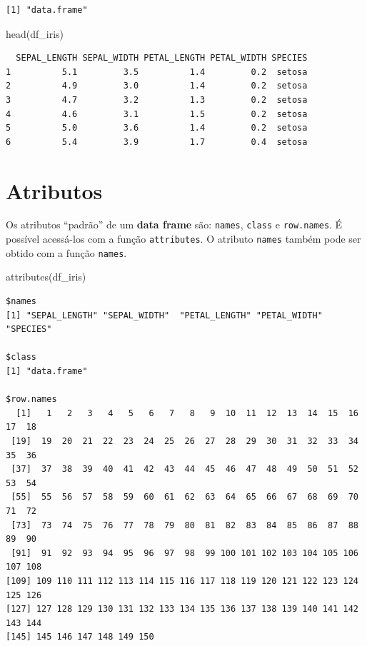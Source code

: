 \documentclass[
  letterpaper,
  DIV=11,
  numbers=noendperiod]{scrreprt}
\newenvironment{Shaded}{\begin{snugshade}}{\end{snugshade}}
\newcommand{\FunctionTok}[1]{\textcolor[rgb]{0.28,0.35,0.67}{#1}}
\newcommand{\NormalTok}[1]{\textcolor[rgb]{0.00,0.23,0.31}{#1}}
\begin{document}
\begin{verbatim}
[1] "data.frame"
\end{verbatim}

\begin{Shaded}
\begin{Highlighting}[]
\FunctionTok{head}\NormalTok{(df\_iris)}
\end{Highlighting}
\end{Shaded}

\begin{verbatim}
  SEPAL_LENGTH SEPAL_WIDTH PETAL_LENGTH PETAL_WIDTH SPECIES
1          5.1         3.5          1.4         0.2  setosa
2          4.9         3.0          1.4         0.2  setosa
3          4.7         3.2          1.3         0.2  setosa
4          4.6         3.1          1.5         0.2  setosa
5          5.0         3.6          1.4         0.2  setosa
6          5.4         3.9          1.7         0.4  setosa
\end{verbatim}

\hypertarget{atributos}{%
\section{Atributos}\label{atributos}}

Os atributos ``padrão'' de um \textbf{data frame} são: \texttt{names},
\texttt{class} e \texttt{row.names}. É possível acessá-los com a função
\texttt{attributes}. O atributo \texttt{names} também pode ser obtido
com a função \texttt{names}.

\begin{Shaded}
\begin{Highlighting}[]
\FunctionTok{attributes}\NormalTok{(df\_iris)}
\end{Highlighting}
\end{Shaded}

\begin{verbatim}
$names
[1] "SEPAL_LENGTH" "SEPAL_WIDTH"  "PETAL_LENGTH" "PETAL_WIDTH"  "SPECIES"     

$class
[1] "data.frame"

$row.names
  [1]   1   2   3   4   5   6   7   8   9  10  11  12  13  14  15  16  17  18
 [19]  19  20  21  22  23  24  25  26  27  28  29  30  31  32  33  34  35  36
 [37]  37  38  39  40  41  42  43  44  45  46  47  48  49  50  51  52  53  54
 [55]  55  56  57  58  59  60  61  62  63  64  65  66  67  68  69  70  71  72
 [73]  73  74  75  76  77  78  79  80  81  82  83  84  85  86  87  88  89  90
 [91]  91  92  93  94  95  96  97  98  99 100 101 102 103 104 105 106 107 108
[109] 109 110 111 112 113 114 115 116 117 118 119 120 121 122 123 124 125 126
[127] 127 128 129 130 131 132 133 134 135 136 137 138 139 140 141 142 143 144
[145] 145 146 147 148 149 150
\end{verbatim}
\end{document}
